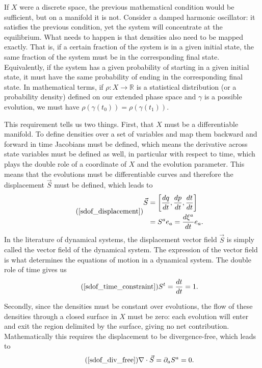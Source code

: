 \documentclass[fleqn,10pt]{wlscirep}
\begin{document}
If $X$ were a discrete space, the previous mathematical condition would be sufficient, but on a manifold it is not. Consider a damped harmonic oscillator: it satisfies the previous condition, yet the system will concentrate at the equilibrium. What needs to happen is that densities also need to be mapped exactly. That is, if a certain fraction of the system is in a given initial state, the same fraction of the system must be in the corresponding final state. Equivalently, if the system has a given probability of starting in a given initial state, it must have the same probability of ending in the corresponding final state. In mathematical terms, if $\rho : X \to \mathbb{R}$ is a statistical distribution (or a probability density) defined on our extended phase space and $\gamma$ is a possible evolution, we must have $\rho(\gamma(t_0)) = \rho(\gamma(t_1))$.

This requirement tells us two things. First, that $X$ must be a differentiable manifold. To define densities over a set of variables and map them backward and forward in time Jacobians must be defined, which means the derivative across state variables must be defined as well, in particular with respect to time, which plays the double role of a coordinate of $X$ and the evolution parameter. This means that the evolutions must be differentiable curves and therefore the displacement $\vec{S}$ must be defined, which leads to
\begin{equation}
\tag*{(\ref{sdof_displacement})}
	\begin{aligned}
		\vec{S} &= \left[ \frac{dq}{dt},\frac{dp}{dt},\frac{dt}{dt} \right] \\
		&= S^a e_a = \frac{d\xi^a}{dt} e_a .
	\end{aligned}
\end{equation}
In the literature of dynamical systems, the displacement vector field $\vec{S}$ is simply called the vector field of the dynamical system. The expression of the vector field is what determines the equations of motion in a dynamical system. The double role of time gives us
\begin{equation}
\tag*{(\ref{sdof_time_constraint})}
 	S^t=\frac{dt}{dt}=1.
 \end{equation}

Secondly, since the densities must be constant over evolutions, the flow of these densities through a closed surface in $X$ must be zero: each evolution will enter and exit the region delimited by the surface, giving no net contribution. Mathematically this requires the displacement to be divergence-free, which leads to
\begin{equation}
\tag*{(\ref{sdof_div_free})}
	\nabla \cdot \vec{S} = \partial_a S^a = 0.
\end{equation}
\end{document}
